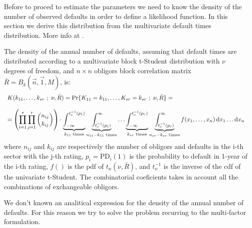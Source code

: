 \documentclass[11pt,fleqn]{book} %
\begin{document}
Before to proced to estimate the parameters we need to know the density
of the number of observed defaults in order to define a likelihood 
function. In this section we derive this distribution from the multivariate
default times distribution. More info at \cite{gordy:2002} \cite{roncalli:2004}.

\begin{proposition}
	The density of the annual number of defaults, assuming that default 
	times are distributed according to a multivariate block t-Student distribution
	with $\nu$ degrees of freedom, and $n {\times} n$ obligors block correlation 
	matrix $\bar{R} = B_k(\vec{n},\vec{1},M)$, is:
	\begin{displaymath}
		\begin{array}{l}
			K(k_{11},\dots,k_{sr}\ ;\ \nu, \bar{R}) = 
			\Pr\{K_{11}=k_{11},\dots,K_{sr}=k_{sr}\ ;\ \nu, \bar{R}\} = \\
			\\
			= \left( \displaystyle \prod_{i=1}^s \prod_{j=1}^r \binom{n_{ij}}{k_{ij}} \right) \cdot       
			\displaystyle                                                                                 
			\underbrace{\int_{-\infty}^{t_{\nu}^{-1}(p_1)}}_{k_{11} \text{ times}}                        
			\underbrace{\int_{t_{\nu}^{-1}(p_1)}^{\infty}}_{n_{11}-k_{11} \text{ times}}                  
			\dots                                                                                         
			\underbrace{\int_{-\infty}^{t_{\nu}^{-1}(p_r)}}_{k_{sr} \text{ times}}                        
			\underbrace{\int_{t_{\nu}^{-1}(p_r)}^{\infty}}_{n_{sr}-k_{sr} \text{ times}}                  
			f(x_1,\dots,x_n) \mathop{\mathrm{{}d}}\mathopen{} x_1 \dots \mathop{\mathrm{{}d}}\mathopen{} x_n                                                        
		\end{array}
	\end{displaymath}
	where $n_{ij}$ and $k_{ij}$ are respectively the number of obligors and 
	defaults in the i-th sector with the j-th rating, $p_i = \text{PD}_i(1)$ 
	is the probability to default in 1-year of the i-th rating, $f()$ is the 
	pdf of $t_n(\nu,\bar{R})$, and $t_{\nu}^{-1}$ is the inverse of the cdf
	of the univariate t-Student. The combinatorial coeficients takes in 
	account all the combinations of exchangeable obligors.
\end{proposition}

We don't known an analitical expression for the density of the annual 
number of defaults. For this reason we try to solve the problem recurring 
to the multi-factor formulation.
\end{document}
